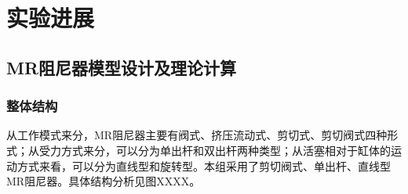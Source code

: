 \section{实验进展}
\subsection{MR阻尼器模型设计及理论计算}
\subsubsection{整体结构}
从工作模式来分，MR阻尼器主要有阀式、挤压流动式、剪切式、剪切阀式四种形式；从受力方式来分，可以分为单出杆和双出杆两种类型；从活塞相对于缸体的运动方式来看，可以分为直线型和旋转型。本组采用了剪切阀式、单出杆、直线型MR阻尼器。具体结构分析见图XXXX。

\begin{figure}[H]

\end{figure}


